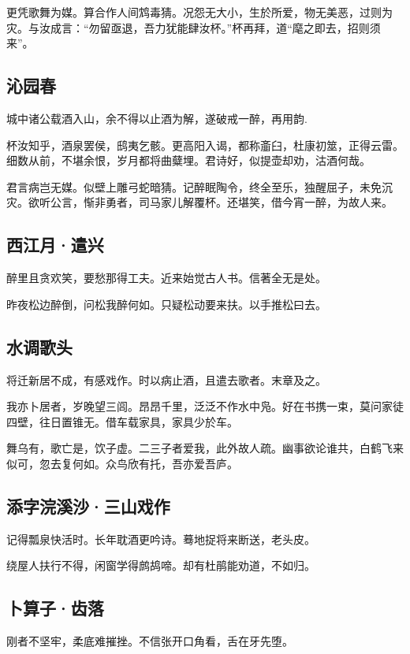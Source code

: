 \documentclass[a5paper]{ctexart}
\begin{document}
	更凭歌舞为媒。算合作人间鸩毒猜。况怨无大小，生於所爱，物无美恶，过则为灾。与汝成言：“勿留亟退，吾力犹能肆汝杯。”杯再拜，道“麾之即去，招则须来”。
	
	\subsection{沁园春}
	\begin{small}
		城中诸公载酒入山，余不得以止酒为解，遂破戒一醉，再用韵.
	\end{small}
	
	杯汝知乎，酒泉罢侯，鸱夷乞骸。更高阳入谒，都称齑臼，杜康初筮，正得云雷。细数从前，不堪余恨，岁月都将曲糵埋。君诗好，似提壶却劝，沽酒何哉。
	
	君言病岂无媒。似壁上雕弓蛇暗猜。记醉眠陶令，终全至乐，独醒屈子，未免沉灾。欲听公言，惭非勇者，司马家儿解覆杯。还堪笑，借今宵一醉，为故人来。
	
	\subsection{西江月·遣兴}
	醉里且贪欢笑，要愁那得工夫。近来始觉古人书。信著全无是处。
	
	昨夜松边醉倒，问松我醉何如。只疑松动要来扶。以手推松曰去。
	
	\subsection{水调歌头}
	\begin{small}
		将迁新居不成，有感戏作。时以病止酒，且遣去歌者。末章及之。
	\end{small}

	我亦卜居者，岁晚望三闾。昂昂千里，泛泛不作水中凫。好在书携一束，莫问家徒四壁，往日置锥无。借车载家具，家具少於车。
	
	舞乌有，歌亡是，饮子虚。二三子者爱我，此外故人疏。幽事欲论谁共，白鹤飞来似可，忽去复何如。众鸟欣有托，吾亦爱吾庐。
	
	\subsection{添字浣溪沙·三山戏作}
	记得瓢泉快活时。长年耽酒更吟诗。蓦地捉将来断送，老头皮。
	
	绕屋人扶行不得，闲窗学得鹧鸪啼。却有杜鹃能劝道，不如归。
	
	\subsection{卜算子·齿落}
	刚者不坚牢，柔底难摧挫。不信张开口角看，舌在牙先堕。
	
\end{document}
